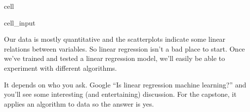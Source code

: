 \documentclass[letterpaper,10pt,english]{jupyterBook}
\begin{document}
\begin{sphinxuseclass}{cell}\begin{sphinxVerbatimInput}

\begin{sphinxuseclass}{cell_input}
\begin{sphinxVerbatim}[commandchars=\\\{\}]
    
\end{sphinxVerbatim}

\end{sphinxuseclass}\end{sphinxVerbatimInput}

\end{sphinxuseclass}
\sphinxAtStartPar
Our data is mostly quantitative and the scatterplots indicate some linear relations between variables. So linear regression isn’t a bad place to start. Once we’ve trained and tested a linear regression model, we’ll easily be able to experiment with different algorithms.

\begin{sphinxShadowBox}

\sphinxAtStartPar
It depends on who you ask. Google “Is linear regression machine learning?” and you’ll see some interesting (and entertaining) discussion. For the capstone, it applies an algorithm to data so the answer is \sphinxhyphen{}yes.
\end{sphinxShadowBox}
\end{document}
